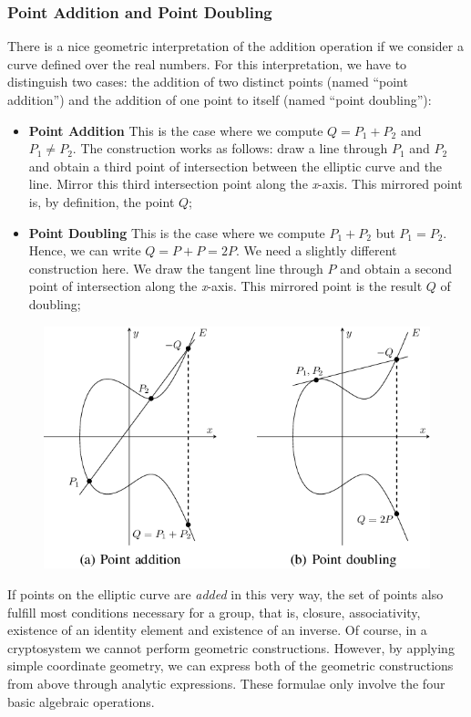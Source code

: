 \documentclass[11pt, a4paper]{article}
\newcommand{\doublequotes}[1]{“#1”}
\begin{document}
\subsubsection{Point Addition and Point Doubling}
There is a nice geometric interpretation of the addition operation if we consider a curve defined over the real numbers. For this interpretation, we have to distinguish two cases: the addition of two distinct points (named \doublequotes{point addition}) and the addition of one point to itself (named \doublequotes{point doubling}):
\begin{itemize}
    \item \textbf{Point Addition} This is the case where we compute $Q=P_1+P_2$ and $P_1\not=P_2$. The construction works as follows: draw a line through $P_1$ and $P_2$ and obtain a third point of intersection between the elliptic curve and the line. Mirror this third intersection point along the \textit{x}-axis. This mirrored point is, by definition, the point $Q$;
    \item \textbf{Point Doubling} This is the case where we compute $P_1+P_2$ but $P_1=P_2$. Hence, we can write $Q=P+P=2P$. We need a slightly different construction here. We draw the tangent line through $P$ and obtain a second point of intersection along the \textit{x}-axis. This mirrored point is the result $Q$ of doubling;
\end{itemize}
\begin{figure}[H]
    \centering
    \includegraphics[scale=0.75]{immagini/EC/1.png}
\end{figure}
If points on the elliptic curve are \textit{added} in this very way, the set of points also fulfill most conditions necessary for a group, that is, closure, associativity, existence of an identity element and existence of an inverse. Of course, in a cryptosystem we cannot perform geometric constructions. However, by applying simple coordinate geometry, we can express both of the geometric constructions from above through analytic expressions. These formulae only involve the four basic algebraic operations.
\end{document}
